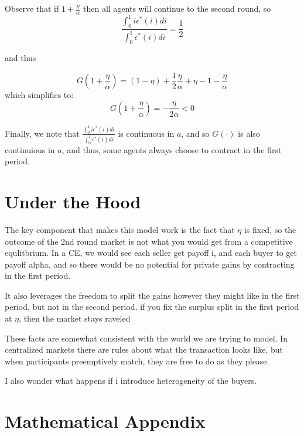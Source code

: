 \documentclass[AER]{AEA}
\begin{document}
Observe that if $1+\frac{\eta }{\alpha}$ then all agents will continue to the second round, so
$$\frac{\int_0^1 i \epsilon^*(i) di}{\int_0^1  \epsilon^*(i) di} = \frac{1}{2} $$

and thus 

$$G(1+\frac{\eta }{\alpha}) = (1-\eta) + \frac{1}{2} \frac{   \eta }{\alpha } + \eta -1 -\frac{\eta }{\alpha} $$
which simplifies to:
\begin{equation} \label{eq:G_g_0}
G(1+\frac{\eta }{\alpha}) =-\frac{\eta}{ 2 \alpha } < 0 
\end{equation}


 Finally, we note that $\frac{\int_0^1 i \epsilon^*(i) di}{\int_0^1  \epsilon^*(i) di} $ is continuous in $a$, and so $G(\cdot)$ is also continuious in $a$, and thus, some agents always choose to contract in the first period.

\section{Under the Hood}
The key component that makes this model work is the fact that $\eta$ is fixed, so the outcome of the 2nd round market is not what you would get from a competitive equlitbrium.  In a CE, we would see each seller get payoff i, and each buyer to get payoff alpha, and so there would be no potential for private gains by contracting in the first period.  

It also leverages the freedom to split the gains however they might like in the first period, but not in the second period.  if you fix the surplus split in the first period at $\eta$, then the market stays raveled

These facts are somewhat consistent with the world we are trying to model.  In centralized markets there are rules about what the transaction looks like, but when participants preemptively match, they are free to do as they please.

I also wonder what happens if i introduce heterogeneity of the buyers.  



\appendix

\section{Mathematical Appendix}
\end{document}
